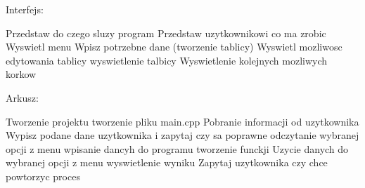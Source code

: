 Interfejs\+:

Przedstaw do czego sluzy program Przedstaw uzytkownikowi co ma zrobic Wyswietl menu Wpisz potrzebne dane (tworzenie tablicy) Wyswietl mozliwosc edytowania tablicy wyswietlenie talbicy Wyswietlenie kolejnych mozliwych korkow

Arkusz\+:

Tworzenie projektu tworzenie pliku main.\+cpp Pobranie informacji od uzytkownika Wypisz podane dane uzytkownika i zapytaj czy sa poprawne odczytanie wybranej opcji z menu wpisanie dancyh do programu tworzenie funckji Uzycie danych do wybranej opcji z menu wyswietlenie wyniku Zapytaj uzytkownika czy chce powtorzyc proces 